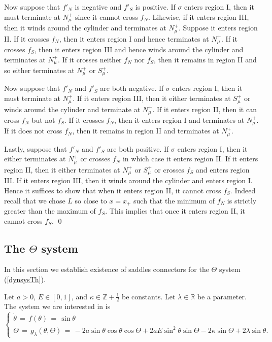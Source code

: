 \documentclass[11 pt]{article}
\renewcommand\l{\lambda}
\renewcommand\({\left(}
\renewcommand\){\right)}
\newcommand\<{\langle}
\renewcommand\>{\rangle}
\renewcommand\l{\lambda}
\newcommand\8{\infty}
\newcommand{\R}{\mathbb R}
\newcommand{\Z}{\mathbb{Z}}
\begin{document}
Now suppose that $f'_N$ is negative and $f'_S$ is positive. If $\sigma$ enters region I, then it must terminate at $N^+_\mu$ since it cannot cross $f_N$. Likewise, if it enters region III, then it winds around the cylinder and terminates at $N^+_\mu$. Suppose it enters region II. If it crosses $f_N$, then it enters region I and hence terminates at $N^+_\mu$. If it crosses $f_S$, then it enters region III and hence winds around the cylinder and terminates at $N^+_\mu$. If it crosses neither $f_N$ nor $f_S$, then it remains in region II and so either terminates at $N^+_\mu$ or $S^+_\mu$. 
 
Now suppose that $f'_N$ and $f'_S$ are both negative.  If $\sigma$ enters region I, then it must terminate at $N^+_\mu$. If it enters region III, then it either terminates at $S^+_\mu$ or winds around the cylinder and terminate at $N^+_\mu$. If it enters region II, then it can cross $f_N$ but not $f_S$. If it crosses $f_N$, then it enters region I and terminates at $N^+_\mu$. If it does not cross $f_N$, then it remains in region II and terminates at $N^+_\mu$. 

Lastly, suppose that $f'_N$ and $f'_S$ are both positive. If $\sigma$ enters region I, then it either terminates at $N^+_\mu$ or crosses $f_N$ in which case it enters region II. If it enters region II, then it either terminates at $N^+_\mu$ or $S^+_\mu$ or crosses $f_S$ and enters region III. If it enters region III, then it winds around the cylinder and enters region I. Hence it suffices to show that when it enters region II, it cannot cross $f_S$. Indeed recall that we chose $L$ so close to $x = x_+$ such that the minimum of $f_N$ is strictly greater than the maximum of $f_S$. This implies that once it enters region II, it cannot cross $f_S$. 
\qed

\medskip
\medskip

\subsection{The $\Theta$ system}\label{th sec}

In this section we establish existence of saddles connectors for the $\Theta$ system (\ref{dynsysTh}). 

Let $a > 0$, $E \in [0,1]$, and $\kappa \in \Z + \frac{1}{2}$ be constants. Let $\l \in \R$ be a parameter. The system we are interested in is 
\[  \left\{
 \begin{array}{ll}
      \dot{\theta} \,=\, f(\theta) \,=\, \sin \theta   \\
      \dot{\Theta} \,=\, g_\lambda(\theta,\Theta) \,=\, -2a\sin \theta \cos\theta \cos \Theta + 2aE \sin^2 \theta \sin \Theta - 2\kappa \sin \Theta + 2\lambda \sin \theta.      
\end{array} 
\right. \]
\end{document}

